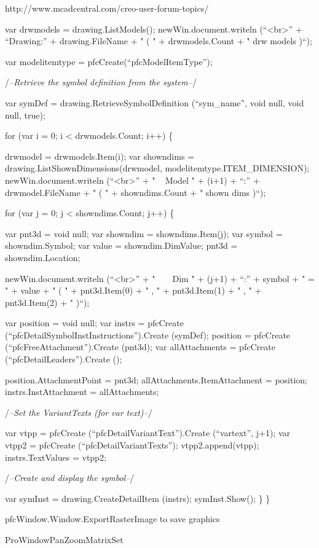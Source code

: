 \documentclass[]{article}
\begin{document}
http://www.mcadcentral.com/creo-user-forum-topics/

var drwmodels = drawing.ListModels(); newWin.document.writeln
(``\textless{}br\textgreater{}'' + ``Drawing:'' + drawing.FileName + " (
" + drwmodels.Count + " drw models )``);

var modelitemtype = pfcCreate(``pfcModelItemType'');

/\emph{--Retrieve the symbol definition from the system--}/

var symDef = drawing.RetrieveSymbolDefinition (``sym\_name'', void null,
void null, true);

for (var i = 0; i \textless{} drwmodels.Count; i++) \{

drwmodel = drwmodels.Item(i); var showndims =
drawing.ListShownDimensions(drwmodel, modelitemtype.ITEM\_DIMENSION);
newWin.document.writeln (``\textless{}br\textgreater{}'' + " ~ Model " +
(i+1) + ``:'' + drwmodel.FileName + " ( " + showndims.Count + " shown
dims )``);

for (var j = 0; j \textless{} showndims.Count; j++) \{

var pnt3d = void null; var showndim = showndims.Item(j); var symbol =
showndim.Symbol; var value = showndim.DimValue; pnt3d =
showndim.Location;

newWin.document.writeln (``\textless{}br\textgreater{}'' + " ~ ~ Dim " +
(j+1) + ``:'' + symbol + " = " + value + " ( " + pnt3d.Item(0) + " , " +
pnt3d.Item(1) + " , " + pnt3d.Item(2) + " )``);

var position = void null; var instrs = pfcCreate
(``pfcDetailSymbolInstInstructions'').Create (symDef); position =
pfcCreate (``pfcFreeAttachment'').Create (pnt3d); var allAttachments =
pfcCreate (``pfcDetailLeaders'').Create ();

position.AttachmentPoint = pnt3d; allAttachments.ItemAttachment =
position; instrs.InstAttachment = allAttachments;

/\emph{--Set the VariantTexts (for var text)--}/

var vtpp = pfcCreate (``pfcDetailVariantText'').Create (``vartext'',
j+1); var vtpp2 = pfcCreate (``pfcDetailVariantTexts'');
vtpp2.append(vtpp); instrs.TextValues = vtpp2;

/\emph{--Create and display the symbol--}/

var symInst = drawing.CreateDetailItem (instrs); symInst.Show(); \} \}

pfcWindow.Window.ExportRasterImage to save graphics

ProWindowPanZoomMatrixSet
\end{document}
